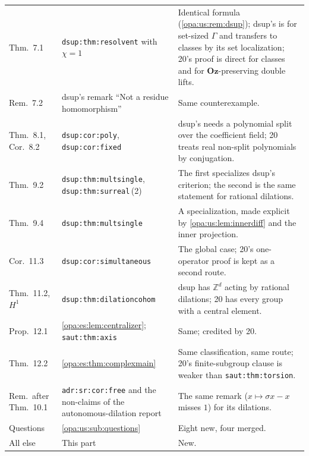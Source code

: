 \documentclass[11pt,oneside]{article}
\numberwithin{equation}{section}
\theoremstyle{definition}
\theoremstyle{remark}
\newcommand{\Oz}{\mathbf{Oz}}
\newcommand{\Z}{\mathbb Z}
\newcommand{\lbl}[1]{\nolinkurl{#1}}
\begin{document}
\begin{center}
\begin{longtable}{>{\raggedright\arraybackslash}p{}>{\raggedright\arraybackslash}p{}>{\raggedright\arraybackslash}p{}}
Thm.~7.1 & \lbl{dsup:thm:resolvent} with $\chi=1$ & Identical formula (\cref{opa:us:rem:dsup}); dsup's is for set-sized $\Gamma$ and
transfers to classes by its set localization; 20's proof is direct for classes and for $\Oz$-preserving double lifts.\\
Rem.~7.2 & dsup's remark ``Not a residue homomorphism'' & Same counterexample.\\
Thm.~8.1, Cor.~8.2 & \lbl{dsup:cor:poly}, \lbl{dsup:cor:fixed} & dsup's needs a polynomial split over the coefficient field; 20
treats real non-split polynomials by conjugation.\\
Thm.~9.2 & \lbl{dsup:thm:multsingle}, \lbl{dsup:thm:surreal}\,(2) & The first specializes dsup's criterion; the second is the same
statement for rational dilations.\\
Thm.~9.4 & \lbl{dsup:thm:multsingle} & A specialization, made explicit by \cref{opa:us:lem:innerdiff} and the inner projection.\\
Cor.~11.3 & \lbl{dsup:cor:simultaneous} & The global case; 20's one-operator proof is kept as a second route.\\
Thm.~11.2, $H^1$ & \lbl{dsup:thm:dilationcohom} & dsup has $\Z^d$ acting by rational dilations; 20 has every group with a central
element.\\
Prop.~12.1 & \cref{opa:es:lem:centralizer}; \lbl{saut:thm:axis} & Same; credited by 20.\\
Thm.~12.2 & \cref{opa:es:thm:complexmain} & Same classification, same route; 20's finite-subgroup clause is weaker than
\lbl{saut:thm:torsion}.\\
Rem.~after Thm.~10.1 & \lbl{adr:sr:cor:free} and the non-claims of the autonomous-dilation report & The same remark
($x\mapsto\sigma x-x$ misses $1$) for its dilations.\\
Questions & \cref{opa:us:sub:questions} & Eight new, four merged.\\
All else & This part & New.\\
\bottomrule
\end{longtable}
\end{center}
\end{document}
